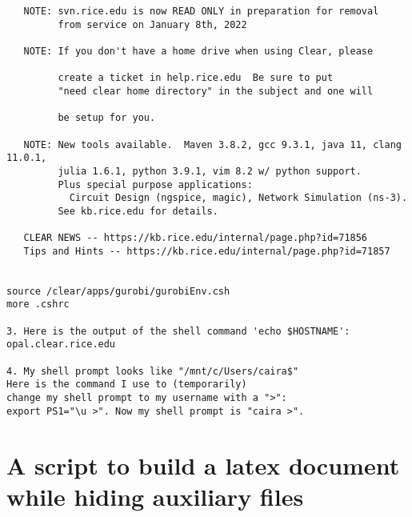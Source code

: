 \documentclass[11pt]{article}
\begin{document}
\begin{verbatim}
   NOTE: svn.rice.edu is now READ ONLY in preparation for removal
         from service on January 8th, 2022

   NOTE: If you don't have a home drive when using Clear, please

         create a ticket in help.rice.edu  Be sure to put
         "need clear home directory" in the subject and one will

         be setup for you.

   NOTE: New tools available.  Maven 3.8.2, gcc 9.3.1, java 11, clang 11.0.1,
         julia 1.6.1, python 3.9.1, vim 8.2 w/ python support.
         Plus special purpose applications:
           Circuit Design (ngspice, magic), Network Simulation (ns-3).
         See kb.rice.edu for details.

   CLEAR NEWS -- https://kb.rice.edu/internal/page.php?id=71856
   Tips and Hints -- https://kb.rice.edu/internal/page.php?id=71857


source /clear/apps/gurobi/gurobiEnv.csh
more .cshrc

3. Here is the output of the shell command 'echo $HOSTNAME': 
opal.clear.rice.edu

4. My shell prompt looks like "/mnt/c/Users/caira$" 
Here is the command I use to (temporarily) 
change my shell prompt to my username with a ">": 
export PS1="\u >". Now my shell prompt is "caira >". 

\end{verbatim}

\section{A script to build a latex document while hiding auxiliary files}
\end{document}

